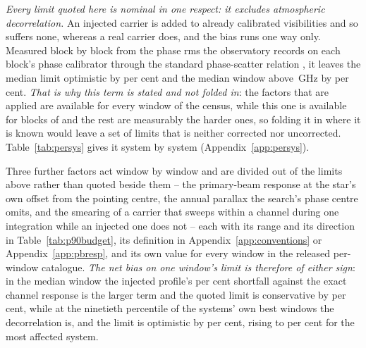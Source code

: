 \emph{Every limit quoted here is nominal in one respect: it excludes
atmospheric decorrelation.} An injected carrier is added to already calibrated
visibilities and so suffers none, whereas a real carrier does, and the bias
runs one way only. Measured block by block from the phase rms the observatory
records on each block's phase calibrator \citep[\S\S10.4.11,
11.3.1]{ALMAHandbook} through the standard phase-scatter relation
\citep[Eq.~3]{Richards2022}, it leaves the median limit optimistic by
\SensDecorPct{} per cent and the median window above \SensDecorHiGHz\,GHz by
\SensDecorHiPct{} per cent. \emph{That is why this term is stated and not
folded in}: the factors that are applied are available for every window of the
census, while this one is available for \SensDecorNBlk{} blocks of
\SensDecorNBlkTot{} and the rest are measurably the harder ones, so folding it
in where it is known would leave a set of limits that is neither corrected nor
uncorrected. Table~\ref{tab:persys} gives it system by system
(Appendix~\ref{app:persys}).

Three further factors act window by window and are divided out of the limits
above rather than quoted beside them -- the primary-beam response at the star's
own offset from the pointing centre, the annual parallax the search's phase
centre omits, and the smearing of a carrier that sweeps within a channel during
one integration while an injected one does not -- each with its range and its
direction in Table~\ref{tab:p90budget}, its definition in
Appendix~\ref{app:conventions} or Appendix~\ref{app:pbresp}, and its own value
for every window in the released per-window catalogue. \emph{The net bias on
one window's
limit is therefore of either sign}: in the median window the injected profile's
\InjShortPct{} per cent shortfall against the exact channel response is the
larger term and the quoted limit is conservative by \NmNetConsPct{} per cent,
while at the ninetieth percentile of the systems' own best windows the
decorrelation is, and the limit is optimistic by \NmNetOptPct{} per cent,
rising to \NmNetOptMaxPct{} per cent for the most affected system.

